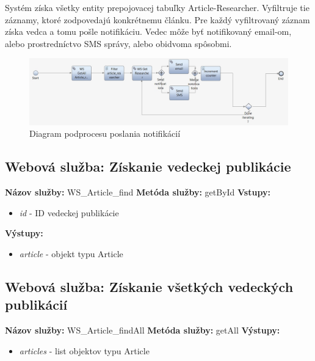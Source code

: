 \documentclass[10pt,oneside,slovak,a4paper]{article}
\begin{document}
Systém získa všetky entity prepojovacej tabuľky Article-Researcher. Vyfiltruje tie záznamy, ktoré zodpovedajú konkrétnemu článku. Pre každý vyfiltrovaný záznam získa vedca a tomu pošle notifikáciu. Vedec môže byť notifikovaný email-om, alebo prostredníctvo SMS správy, alebo obidvoma spôsobmi.

\begin{figure} [H]
\centering
\includegraphics[scale=0.4]{diagrams/diagNotification.jpg} 
\caption{Diagram podprocesu poslania notifikácií}
\end{figure}







\subsection{Webová služba: Získanie vedeckej publikácie}
\textbf{Názov služby:} WS\_Article\_find
\textbf{Metóda služby:} getById
\textbf{Vstupy:}
	\begin{itemize}
		\item \textit{id} - ID vedeckej publikácie
	\end{itemize}
\textbf{Výstupy:}
	\begin{itemize}
		\item \textit{article} - objekt typu Article
	\end{itemize}
	
\subsection{Webová služba: Získanie všetkých vedeckých publikácií}
\textbf{Názov služby:}  WS\_Article\_findAll
\textbf{Metóda služby:} getAll
\textbf{Výstupy:}
	\begin{itemize}
		\item \textit{articles} - list objektov typu Article
	\end{itemize}
	
\end{document}
